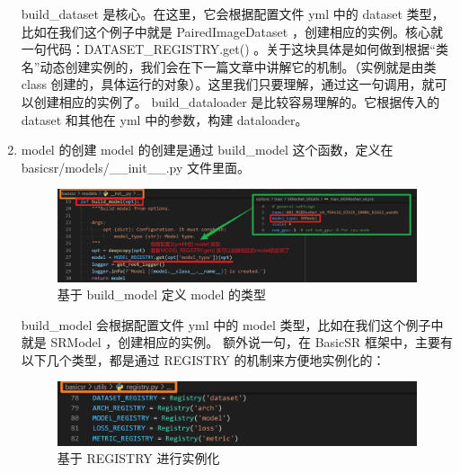 \documentclass[../main.tex]{subfiles}
\begin{document}
\begin{enumerate}
          build\_dataset 是核心。在这里，它会根据配置文件 yml 中的 dataset 类型，比如在我们这个例子中就是 PairedImageDataset ，创建相应的实例。核心就一句代码：DATASET\_REGISTRY.get() 。关于这块具体是如何做到根据“类名”动态创建实例的，我们会在下一篇文章中讲解它的机制。（实例就是由类 class 创建的，具体运行的对象）。这里我们只要理解，通过这一句调用，就可以创建相应的实例了。
          build\_dataloader 是比较容易理解的。它根据传入的 dataset 和其他在 yml 中的参数，构建 dataloader。

    \item model 的创建
          model 的创建是通过 build\_model 这个函数，定义在 basicsr/models/\_\_init\_\_.py 文件里面。

          \begin{figure}[H]
              \begin{center}
                  \includegraphics[width=0.7\linewidth]{figures/getting_start_11.png}
                  \caption{基于 build\_model 定义 model 的类型}
                  \label{fig:getting_start_11}
              \end{center}
              \vspace{-0.5cm}
          \end{figure}

          build\_model 会根据配置文件 yml 中的 model 类型，比如在我们这个例子中就是 SRModel ，创建相应的实例。
          额外说一句，在 BasicSR 框架中，主要有以下几个类型，都是通过 REGISTRY 的机制来方便地实例化的：

          \begin{figure}[H]
              \begin{center}
                  \includegraphics[width=0.7\linewidth]{figures/getting_start_12.png}
                  \caption{基于 REGISTRY 进行实例化}
                  \label{fig:getting_start_12}
              \end{center}
              \vspace{-0.5cm}
          \end{figure}


\end{enumerate}
\end{document}
